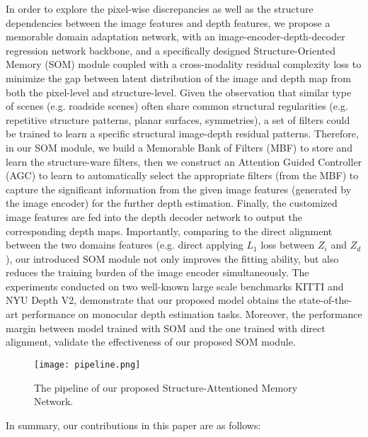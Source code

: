 \documentclass[letterpaper]{article} \usepackage{aaai20}  \usepackage{times}  \usepackage{helvet} \usepackage{courier}  \usepackage{graphicx} \frenchspacing  \setlength{\pdfpagewidth}{8.5in}  \setlength{\pdfpageheight}{11in}  \usepackage{epsfig}
\begin{document}
        \indent In order to explore the pixel-wise discrepancies as well as the structure dependencies between the image features and depth features, we propose a memorable domain adaptation network, with an image-encoder-depth-decoder regression network backbone, and a specifically designed Structure-Oriented Memory (SOM) module coupled with a cross-modality residual complexity loss to minimize the gap between latent distribution of the image and depth map from both the pixel-level and structure-level. Given the observation that similar type of scenes (e.g. roadside scenes) often share common structural regularities (e.g. repetitive structure patterns, planar surfaces, symmetries), a set of filters could be trained to learn a specific structural image-depth residual patterns. Therefore, in our SOM module, we build a Memorable Bank of Filters (MBF) to store and learn the structure-ware filters, then we construct an Attention Guided Controller (AGC) to learn to automatically select the appropriate filters (from the MBF) to capture the significant information from the given image features (generated by the image encoder) for the further depth estimation. Finally, the customized image features are fed into the depth decoder network to output the corresponding depth maps. Importantly, comparing to the direct alignment between the two domains features (e.g. direct applying $L_1$ loss between $Z_i$ and $Z_d$), our introduced SOM module not only improves the fitting ability, but also reduces the training burden of the image encoder simultaneously. The experiments conducted on two well-known large scale benchmarks KITTI and NYU Depth V2, demonstrate that our proposed model obtains the state-of-the-art performance on monocular depth estimation tasks. Moreover, the performance margin between model trained with SOM and the one trained with direct alignment, validate the effectiveness of our proposed SOM module.
        \begin{figure*}
    \begin{center}
    \texttt{[image: pipeline.png]}
    \end{center}
    \vspace{-15pt}
       \caption{The pipeline of our proposed Structure-Attentioned Memory Network. }
    \label{fig:pipeline}
    \vspace{-10pt}
    \end{figure*}
    In summary, our contributions in this paper are as follows:
\end{document}
